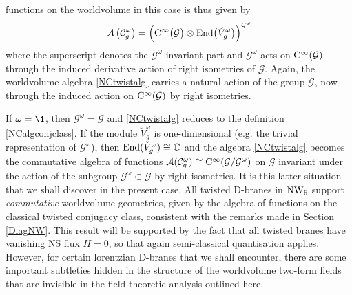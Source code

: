 functions on the worldvolume in this case is thus given by
\begin{equation}
  \label{NCtwistalg}
  \mathcal{A}\left(\mathcal{C}_g^\omega\right)=\Bigl({\rm C}^\infty\bigl(
  \mathcal{G}\bigr)\otimes{\rm End}\bigl(\breve{V}_g^\omega\bigr)
  \Bigr)^{\mathcal{G}^\omega}
\end{equation}
where the superscript denotes the $\mathcal{G}^\omega$-invariant part and
$\mathcal{G}^\omega$ acts on ${\rm C}^\infty(\mathcal{G})$ through the induced
derivative action of right isometries of $\mathcal{G}$. Again, the worldvolume
algebra \eqref{NCtwistalg} carries a natural action of the group $\mathcal{G}$,
now through the induced action on ${\rm C}^\infty(\mathcal{G})$ by right
isometries.

If $\omega=\1$, then $\mathcal{G}^\omega=\mathcal{G}$ and \eqref{NCtwistalg}
reduces to the definition \eqref{NCalgconjclass}. If the module
$\breve{V}_g^\omega$ is one-dimensional (e.g. the trivial representation of
$\mathcal{G}^\omega$), then ${\rm End}(\breve{V}_g^\omega)\cong{\mathbb C}$ and the
algebra \eqref{NCtwistalg} becomes the commutative algebra of functions
$\mathcal{A}(\mathcal{C}_g^\omega)\cong{\rm C}^\infty(\mathcal{G} /
\mathcal{G}^\omega)$ on $\mathcal{G}$ invariant under the action of the subgroup
$\mathcal{G}^\omega\subset\mathcal{G}$ by right isometries. It is this latter
situation that we shall discover in the present case. All twisted D-branes in
$\operatorname{NW}_6$ support {\it commutative} worldvolume geometries, given by the algebra
of functions on the classical twisted conjugacy class, consistent with the
remarks made in Section \ref{DiagNW}. This result will be supported by the fact
that all twisted branes have vanishing NS flux $H=0$, so that again
semi-classical quantisation applies. However, for certain lorentzian D-branes
that we shall encounter, there are some important subtleties hidden in the
structure of the worldvolume two-form fields that are invisible in the field
theoretic analysis outlined here.

